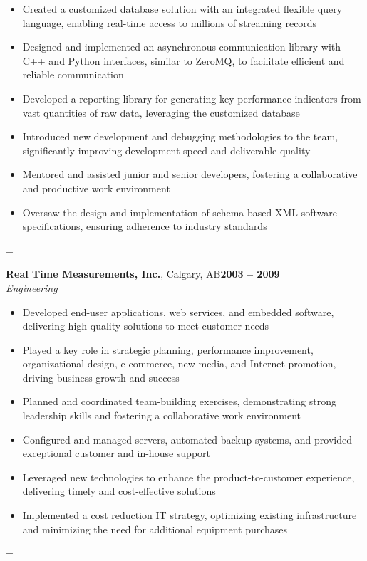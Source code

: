 \documentclass[margin,line]{resume}
\newenvironment{absolutelynopagebreak}
{\par\nobreak\vfil\penalty0\vfilneg
\vtop\bgroup}
{\par\xdef\tpd{\the\prevdepth}\egroup
\prevdepth=\tpd}
\begin{document}
\begin{resume}
\begin{absolutelynopagebreak}
\begin{itemize}
\item Created a customized database solution with an integrated flexible query language, enabling real-time access to millions of streaming records
\item Designed and implemented an asynchronous communication library with C++ and Python interfaces, similar to ZeroMQ, to facilitate efficient and reliable communication
\item Developed a reporting library for generating key performance indicators from vast quantities of raw data, leveraging the customized database
\item Introduced new development and debugging methodologies to the team, significantly improving development speed and deliverable quality
\item Mentored and assisted junior and senior developers, fostering a collaborative and productive work environment
\item Oversaw the design and implementation of schema-based XML software specifications, ensuring adherence to industry standards
\end{itemize}
\end{absolutelynopagebreak}

\vspace{5mm}

\begin{absolutelynopagebreak}
\textbf{Real Time Measurements, Inc.}, Calgary, AB\hfill \textbf{2003 -- 2009}\vspace{2mm}\\\vspace{1mm}%
\textsl{Engineering}

\begin{itemize}
\item Developed end-user applications, web services, and embedded software, delivering high-quality solutions to meet customer needs
\item Played a key role in strategic planning, performance improvement, organizational design, e-commerce, new media, and Internet promotion, driving business growth and success
\item Planned and coordinated team-building exercises, demonstrating strong leadership skills and fostering a collaborative work environment
\item Configured and managed servers, automated backup systems, and provided exceptional customer and in-house support
\item Leveraged new technologies to enhance the product-to-customer experience, delivering timely and cost-effective solutions
\item Implemented a cost reduction IT strategy, optimizing existing infrastructure and minimizing the need for additional equipment purchases
\end{itemize}
\end{absolutelynopagebreak}


\end{resume}
\end{document}
